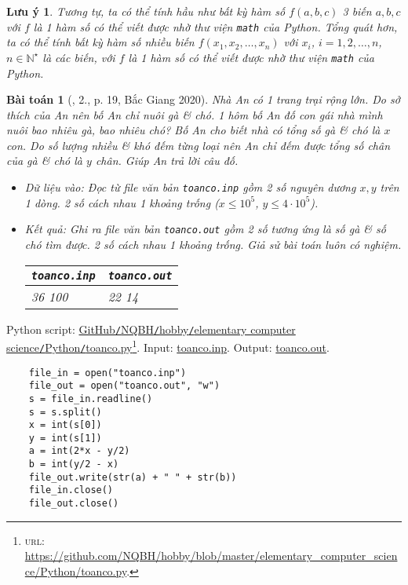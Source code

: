 \documentclass{article}
\newtheorem{baitoan}{Bài toán}
\newtheorem{luuy}{Lưu ý}
\begin{document}
\begin{luuy}
	Tương tự, ta có thể tính hầu như bất kỳ hàm số $f(a,b,c)$ 3 biến $a,b,c$ với $f$ là 1 hàm số có thể viết được nhờ thư viện \texttt{math} của Python. Tổng quát hơn, ta có thể tính bất kỳ hàm số nhiều biến $f(x_1,x_2,\ldots,x_n)$ với $x_i$, $i = 1,2,\ldots,n$, $n\in\mathbb{N}^\star$ là các biến, với $f$ là 1 hàm số có thể viết được nhờ thư viện \texttt{math} của Python.
\end{luuy}

\begin{baitoan}[\cite{VietSTEM2021}, 2., p. 19, Bắc Giang 2020]
	Nhà An có 1 trang trại rộng lớn. Do sở thích của An nên bố An chỉ nuôi gà \& chó. 1 hôm bố An đố con gái nhà mình nuôi bao nhiêu gà, bao nhiêu chó? Bố An cho biết nhà có tổng số gà \& chó là $x$ con. Do số lượng nhiều \& khó đếm từng loại nên An chỉ đếm được tổng số chân của gà \& chó là $y$ chân. Giúp An trả lời câu đố.
	\begin{itemize}
		\item {\sf Dữ liệu vào:} Đọc từ file văn bản \verb|toanco.inp| gồm 2 số nguyên dương $x,y$ trên 1 dòng. 2 số cách nhau 1 khoảng trống ($x\le10^5$, $y\le4\cdot10^5$).
		\item {\sf Kết quả:} Ghi ra file văn bản \verb|toanco.out| gồm 2 số tương ứng là số gà \& số chó tìm được. 2 số cách nhau 1 khoảng trống. Giả sử bài toán luôn có nghiệm.
		\begin{table}[H]
			\centering
			\begin{tabular}{|l|l|}
				\hline
				\texttt{toanco.inp} & \texttt{toanco.out} \\
				\hline
				36 100 & 22 14 \\
				\hline
			\end{tabular}
		\end{table}
	\end{itemize}
\end{baitoan}
Python script: \href{https://github.com/NQBH/hobby/blob/master/elementary_computer_science/Python/toanco.py}{GitHub\texttt{/}NQBH\texttt{/}hobby\texttt{/}elementary computer science\texttt{/}Python\texttt{/}toanco.py}\footnote{\textsc{url}: \url{https://github.com/NQBH/hobby/blob/master/elementary_computer_science/Python/toanco.py}.}. Input: \href{https://github.com/NQBH/hobby/blob/master/elementary_computer_science/Python/toanco.inp}{toanco.inp}. Output: \href{https://github.com/NQBH/hobby/blob/master/elementary_computer_science/Python/toanco.out}{toanco.out}.
\begin{verbatim}
	file_in = open("toanco.inp")
	file_out = open("toanco.out", "w")
	s = file_in.readline()
	s = s.split()
	x = int(s[0])
	y = int(s[1])
	a = int(2*x - y/2)
	b = int(y/2 - x)
	file_out.write(str(a) + " " + str(b))
	file_in.close()
	file_out.close()
\end{verbatim}
\end{document}
